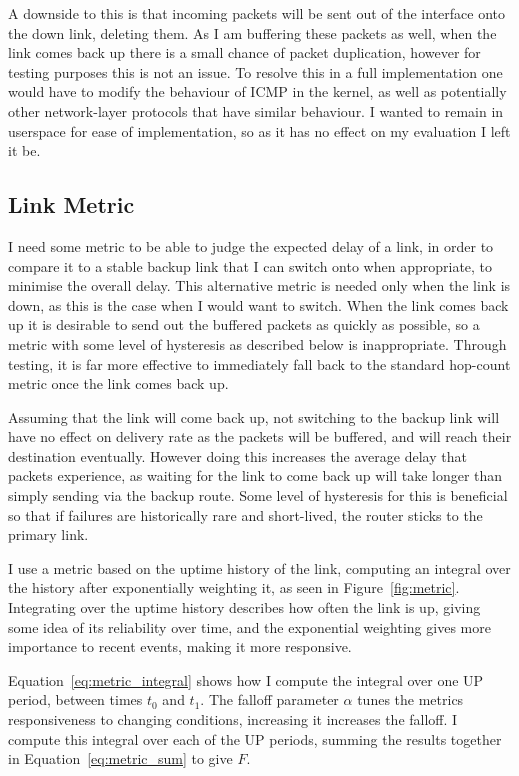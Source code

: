 \documentclass[withindex,glossary,openany]{cam-thesis}
\begin{document}
A downside to this is that incoming packets will be sent out of the interface onto the down link, deleting them. As I am buffering these packets as well, when the link comes back up there is a small chance of packet duplication, however for testing purposes this is not an issue. To resolve this in a full implementation one would have to modify the behaviour of ICMP in the kernel, as well as potentially other network-layer protocols that have similar behaviour. I wanted to remain in userspace for ease of implementation, so as it has no effect on my evaluation I left it be.

\subsection{Link Metric}
\label{subsec:link_metric}

I need some metric to be able to judge the expected delay of a link, in order to compare it to a stable backup link that I can switch onto when appropriate, to minimise the overall delay. This alternative metric is needed only when the link is down, as this is the case when I would want to switch. When the link comes back up it is desirable to send out the buffered packets as quickly as possible, so a metric with some level of hysteresis as described below is inappropriate. Through testing, it is far more effective to immediately fall back to the standard hop-count metric once the link comes back up.

Assuming that the link will come back up, not switching to the backup link will have no effect on delivery rate as the packets will be buffered, and will reach their destination eventually. However doing this increases the average delay that packets experience, as waiting for the link to come back up will take longer than simply sending via the backup route. Some level of hysteresis for this is beneficial so that if failures are historically rare and short-lived, the router sticks to the primary link.

I use a metric based on the uptime history of the link, computing an integral over the history after exponentially weighting it, as seen in Figure~\ref{fig:metric}. Integrating over the uptime history describes how often the link is up, giving some idea of its reliability over time, and the exponential weighting gives more importance to recent events, making it more responsive.

Equation~\ref{eq:metric_integral} shows how I compute the integral over one UP period, between times $t_0$ and $t_1$. The falloff parameter $\alpha$ tunes the metrics responsiveness to changing conditions, increasing it increases the falloff. I compute this integral over each of the UP periods, summing the results together in Equation~\ref{eq:metric_sum} to give $F$.
\end{document}
